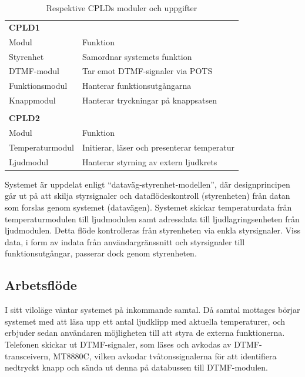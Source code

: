 \documentclass[a4paper,11pt]{article}
\begin{document}
	\begin{table} [H]
		
		\caption{Respektive CPLDs moduler och uppgifter} 
		\label{tab:uppdelningstabell}
	\begin{tabular}{l l}
		
		{\bf CPLD1} \\
		Modul	& Funktion	\\
		\hline
		Styrenhet	& Samordnar systemets funktion \\
		DTMF-modul & Tar emot DTMF-signaler via POTS \\
		Funktionsmodul	& Hanterar funktionsutgångarna \\
		Knappmodul	& Hanterar tryckningar på knappsatsen \\
		\\
		{\bf CPLD2} \\
		Modul	& Funktion	\\
		\hline
		Temperaturmodul	& Initierar, läser och presenterar temperatur \\
		Ljudmodul	& Hanterar styrning av extern ljudkrets \\
		
	\end{tabular}
	\end{table}
	
	Systemet är uppdelat enligt ``dataväg-styrenhet-modellen'', där designprincipen går ut på att skilja styrsignaler
	och dataflödeskontroll (styrenheten) från datan som forslas genom systemet (datavägen). Systemet skickar temperaturdata från temperaturmodulen till ljudmodulen samt adressdata till ljudlagringsenheten från ljudmodulen. Detta flöde kontrolleras från styrenheten via
	enkla styrsignaler. Viss data, i form av indata från användargränssnitt och styrsignaler till funktionsutgångar, passerar dock genom styrenheten.

	\subsection{Arbetsflöde}

I sitt viloläge väntar systemet på inkommande samtal. Då samtal mottages börjar systemet med att läsa upp ett antal ljudklipp med aktuella temperaturer, och erbjuder sedan användaren möjligheten till att styra de externa funktionerna. Telefonen skickar ut DTMF-signaler, som läses och avkodas av DTMF-transceivern, MT8880C, vilken avkodar tvåtonssignalerna för att identifiera nedtryckt knapp och sända ut denna på databussen till DTMF-modulen. 
\end{document}
